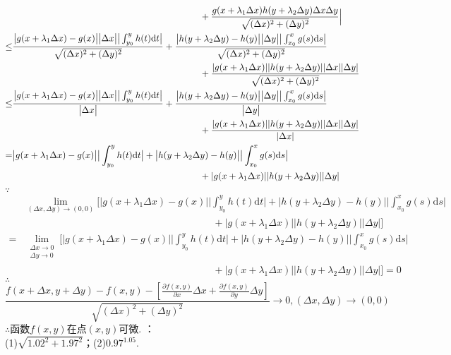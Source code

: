 \documentclass[12pt,UTF8]{ctexart}
\newcommand\LIM[2]{\lim\limits_{#1\rightarrow#2}}
\newcommand{\Int}[4]{\int_{#1}^{#2}#3\mathrm d#4}
\begin{document}
\begin{enumerate}
\[\begin{split}
&\hspace{7.2cm}+\frac{g(x+\lambda_1\Delta x)h(y+\lambda_2\Delta y)\Delta x\Delta y}{\sqrt{(\Delta x)^2+(\Delta y)^2}}\Big|\\
\leq&\frac{\big|g(x+\lambda_1\Delta x)-g(x)\big|\big|\Delta x\big|\big|\Int{y_0}{y}{h(t)}{t}\big|}{\sqrt{(\Delta x)^2+(\Delta y)^2}}+\frac{\big|h(y+\lambda_2\Delta y)-h(y)\big|\big|\Delta y\big|\big|\Int{x_0}{x}{g(s)}{s}\big|}{\sqrt{(\Delta x)^2+(\Delta y)^2}}\\
&\hspace{7.2cm}+\frac{|g(x+\lambda_1\Delta x)||h(y+\lambda_2\Delta y)||\Delta x||\Delta y|}{\sqrt{(\Delta x)^2+(\Delta y)^2}}\\
\leq&\frac{\big|g(x+\lambda_1\Delta x)-g(x)\big|\big|\Delta x\big|\big|\Int{y_0}{y}{h(t)}{t}\big|}{\big|\Delta x\big|}+\frac{\big|h(y+\lambda_2\Delta y)-h(y)\big|\big|\Delta y\big|\big|\Int{x_0}{x}{g(s)}{s}\big|}{\big|\Delta y\big|}\\
&\hspace{7.2cm}+\frac{|g(x+\lambda_1\Delta x)||h(y+\lambda_2\Delta y)||\Delta x||\Delta y|}{|\Delta x|}\\
=&\big|g(x+\lambda_1\Delta x)-g(x)\big|\big|\Int{y_0}{y}{h(t)}{t}\big|+\big|h(y+\lambda_2\Delta y)-h(y)\big|\big|\Int{x_0}{x}{g(s)}{s}\big|\\
&\hspace{7.2cm}+|g(x+\lambda_1\Delta x)||h(y+\lambda_2\Delta y)||\Delta y|
\end{split}\]
$\because$
\[\begin{split}
&\LIM{(\Delta x,\Delta y)}{(0,0)}[\big|g(x+\lambda_1\Delta x)-g(x)\big|\big|\Int{y_0}{y}{h(t)}{t}\big|+\big|h(y+\lambda_2\Delta y)-h(y)\big|\big|\Int{x_0}{x}{g(s)}{s}\big|\\
&\hspace{8cm}+|g(x+\lambda_1\Delta x)||h(y+\lambda_2\Delta y)||\Delta y|]\\
=&\lim\limits_{\substack{\Delta x\rightarrow0\\\Delta y\rightarrow0}}[\big|g(x+\lambda_1\Delta x)-g(x)\big|\big|\Int{y_0}{y}{h(t)}{t}\big|+\big|h(y+\lambda_2\Delta y)-h(y)\big|\big|\Int{x_0}{x}{g(s)}{s}\big|\\
&\hspace{8cm}+|g(x+\lambda_1\Delta x)||h(y+\lambda_2\Delta y)||\Delta y|]=0
\end{split}\]
$\therefore$
\[\frac{f(x+\Delta x,y+\Delta y)-f(x,y)-[\frac{\partial f(x,y)}{\partial x}\Delta x+\frac{\partial f(x,y)}{\partial y}\Delta y]}{\sqrt{(\Delta x)^2+(\Delta y)^2}}\rightarrow0,(\Delta x,\Delta y)\rightarrow(0,0)\]
$\therefore$函数$f(x,y)$在点$(x,y)$可微.
：\\
(1)$\sqrt{1.02^2+1.97^2}$；\quad\quad(2)$0.97^{1.05}$.


\end{enumerate}
\end{document}

